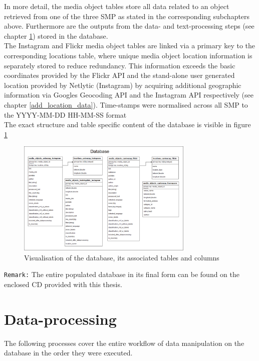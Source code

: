 In more detail, the media object tables store all data related to an object retrieved from one of the three SMP as stated in the corresponding subchapters above. Furthermore are the outputs from the data- and text-processing steps (see chapter \ref{data_processing}) stored in the database.\\ 
The Instagram and Flickr media object tables are linked via a primary key to the corresponding locations table, where unique media object location information is separately stored to reduce redundancy. This information exceeds the basic coordinates provided by the Flickr API and the stand-alone user generated location provided by Netlytic (Instagram) by acquiring additional geographic information via Googles Geocoding API and the Instagram API respectively (see chapter \ref{add_location_data}). Time-stamps were normalised across all SMP to the YYYY-MM-DD HH-MM-SS format \\
\newline
The exact structure and table specific content of the database is visible in figure \ref{fig:database}

\begin{figure}[h]
   \centering
   \includegraphics[width=0.75\textwidth]{img/fusion_db_overview}
   \caption{Visualisation of the database, its associated tables and columns}
   \label{fig:database}
\end{figure}

\texttt{Remark:} The entire populated database in its final form can be found on the enclosed CD provided with this thesis.

\section{Data-processing} \label{data_processing}
The following processes cover the entire workflow of data manipulation on the database in the order they were executed.

